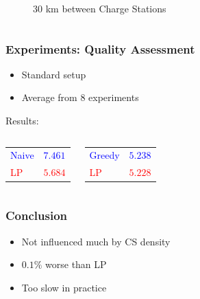 \begin{frame}
\begin{columns}[c]
\begin{center}
\begin{figure}
	  	\caption{30 km between Charge Stations}
	  	\end{figure}
   \end{center}
   \end{columns} 
\end{frame}

\begin{frame}
  \frametitle{Experiments: Quality Assessment}
  \begin{itemize}
  	\item Standard setup
  	\item Average from 8 experiments
  \end{itemize}
  \vspace{0.8cm}
  {\large Results:}
  \begin{columns}[c]
    \begin{center}
    	\begin{tabular}{ | l l |}
    	\textcolor{blue}{Naive} & \textcolor{blue}{$7.461$} \\
    	\textcolor{red}{LP} & \textcolor{red}{$5.684$} \\
    	\end{tabular}
  	\end{center}
    \begin{center}
    	\begin{tabular}{ | l l |}
    	\textcolor{blue}{Greedy} & \textcolor{blue}{$5.238$} \\
    	\textcolor{red}{LP} & \textcolor{red}{$5.228$} \\
    	\end{tabular}  
    \end{center}
   \end{columns} 
\end{frame}

\begin{frame}
  \frametitle{Conclusion}
  \begin{itemize}
  \item Not influenced much by CS density  
  \item $0.1 \%$ worse than LP
  \item Too slow in practice
  \end{itemize}
\end{frame}
